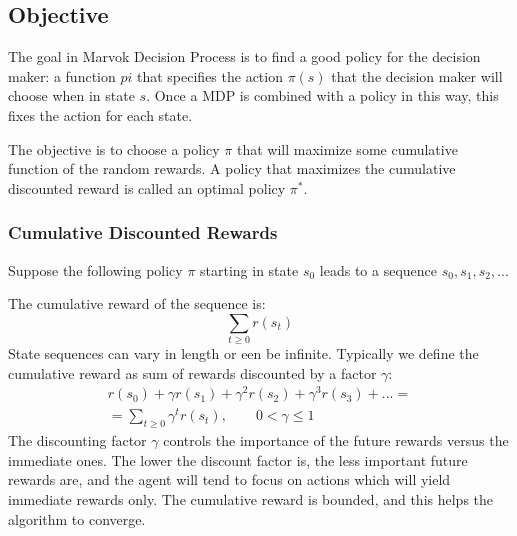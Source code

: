 \subsection{Objective}
The goal in Marvok Decision Process is to find a good policy for the decision maker: a function \(pi\) that specifies the action \(\pi(s)\) that the decision maker will choose when in state \(s\). Once a MDP is combined with a policy in this way, this fixes the action for each state.

The objective is to choose a policy \(\pi\) that will maximize some cumulative function of the random rewards. A policy that maximizes the cumulative discounted reward is called an optimal policy \(\pi^*\).

\subsubsection{Cumulative Discounted Rewards}
Suppose the following policy \(\pi\) starting in state \(s_0\) leads to a sequence \(s_0, s_1, s_2, ...\)

The cumulative reward of the sequence is:
\begin{equation}
    \sum_{t \geq 0} r(s_t)
\end{equation}
State sequences can vary in length or een be infinite. Typically we define the cumulative reward as sum of rewards discounted by a factor \(\gamma\):
\begin{align}
    r(s_0) + \gamma r(s_1) + \gamma^2 r(s_2) + \gamma^3 r(s_3) + ... = \\
    = \sum_{t \geq 0} \gamma^t r(s_t), \qquad 0 < \gamma \leq 1
\end{align}
The discounting factor \(\gamma\) controls the importance of the future rewards versus the immediate ones. The lower the discount factor is, the less important future rewards are, and the agent will tend to focus on actions which will yield immediate rewards only. The cumulative reward is bounded, and this helps the algorithm to converge.

